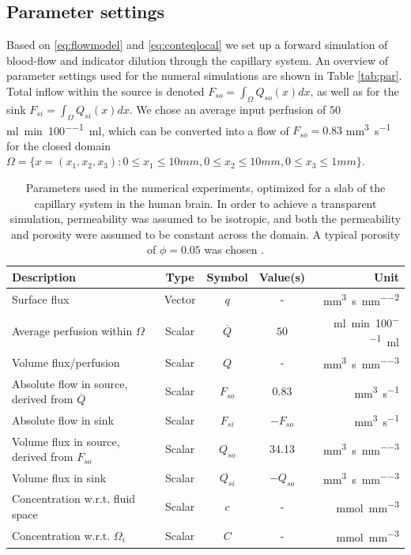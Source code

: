 \documentclass[paper=a4, fontsize=11pt,parskip=half,headings=small]{scrartcl}
\newcommand{\Perf}{Q}
\newcommand{\siFmm}{\milli\meter\cubed\per\second}
\newcommand{\siQmm}{\milli\meter\cubed\per\second\per\milli\meter\cubed}
\newcommand{\siPml}{\milli\litre\per\minute\per100\milli\litre}
\newcommand{\siq}{\milli\meter\cubed\per\second\per\milli\meter\squared}
\newcommand{\sic}{\milli\mol\per\milli\meter\cubed}
\begin{document}
	\subsection{Parameter settings}
	Based on \eqref{eq:flowmodel} and \eqref{eq:conteqlocal} we set up a forward simulation of blood-flow and indicator dilution through the capillary system.
	An overview of parameter settings used for the numeral simulations are shown in Table \ref{tab:par}. Total inflow within the source is denoted $F_{so} = \int_\Omega Q_{so}(x) dx$, as well as for the sink $F_{si} = \int_\Omega Q_{si}(x) dx$. We chose an average input perfusion of $50$\si{\siPml}, which can be converted into a flow of $F_{so} = 0.83$ \si{\siFmm} for the closed domain $\Omega = \{x = (x_1,x_2,x_3) : 0 \leq x_1 \leq 10mm, 0 \leq x_2 \leq 10mm, 0 \leq x_3 \leq 1 mm\}$.
	\begin{table}[H]
		\centering
	  \caption{Parameters used in the numerical experiments, optimized for a slab of the capillary system in the human brain. In order to achieve a transparent simulation, permeability was assumed to be isotropic, and both the permeability and porosity were assumed to be constant across the domain. A typical porosity of $\phi = 0.05$ was chosen \cite{Smith00}.}		
		\begin{tabular}{ l  c  c c  r }
		    Description 							&	Type 	& Symbol 			& Value(s) 				& Unit 				\\
			\toprule
			Surface flux 							&	Vector 			& $q$				& - 					& \si{\siq} 		\\
		         Average perfusion within $\Omega$		 &	Scalar & $\overline{\Perf}$ 	& $50$ 					& \si{\siPml}		\\
		         Volume flux/perfusion							 &	Scalar & $\Perf$ 	& - 					& \si{\siQmm}		\\
			Absolute flow in source, derived from $\overline{\Perf}$& 	Scalar	& $F_{so}$ 			& \num{0.83}			& \si{\siFmm} \\
			Absolute flow in sink 						&		Scalar		& $F_{si}$ 			& $-F_{so}$ 		 	& \si{\siFmm}  		\\
			Volume flux in source, derived from $F_{so}$& 	Scalar	& $Q_{so}$ 			& \num{34.13}			& \si{\siQmm} \\
			Volume flux in sink 						&		Scalar		& $Q_{si}$ 			& $-Q_{so}$ 		 	& \si{\siQmm}  		\\
			Concentration w.r.t. fluid space			&	Scalar & $c$				& - 					& \si{\sic} 		\\
			Concentration w.r.t. $\Omega_i$		&	Scalar 			& $C$				& - 					& \si{\sic} 		\\

\end{tabular}
\end{table}
\end{document}
